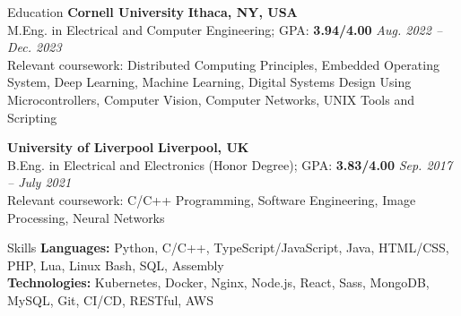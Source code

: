 \documentclass{resume} %
\begin{document}
\begin{rSection}{Education}
{\textbf{Cornell University}} \hfill{\textbf{Ithaca, NY, USA}}
\\ M.Eng. in Electrical and Computer Engineering; GPA: \textbf{3.94/4.00} \hfill{\em Aug. 2022 -- Dec. 2023}
\\ Relevant coursework: Distributed Computing Principles, Embedded Operating System, Deep Learning, Machine Learning, Digital Systems Design Using Microcontrollers, Computer Vision, Computer Networks, UNIX Tools and Scripting

{\textbf{University of Liverpool}} \hfill{\textbf{Liverpool, UK}}
\\ B.Eng. in Electrical and Electronics (Honor Degree); GPA: \textbf{3.83/4.00} \hfill{\em Sep. 2017 -- July 2021}
\\ Relevant coursework: C/C++ Programming, Software Engineering, Image Processing, Neural Networks
\end{rSection}

\begin{rSection}{Skills}
{\textbf{Languages:}} Python, C/C++, TypeScript/JavaScript, Java, HTML/CSS, PHP, Lua, Linux Bash, SQL, Assembly
\\{\textbf{Technologies:}} Kubernetes, Docker, Nginx, Node.js, React, Sass, MongoDB, MySQL, Git, CI/CD, RESTful, AWS


\end{rSection}
\end{document}
